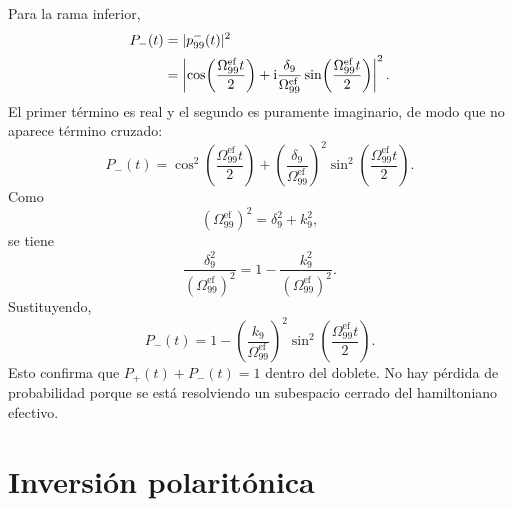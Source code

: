 \documentclass[11pt]{article}
\newcommand{\ii}{\mathrm{i}}
\begin{document}
Para la rama inferior,
\begin{align}
  P_-(t)
  &=
  |p_{99}^{-}(t)|^2
  \notag\\
  &=
  \left|
  \cos\!\left(\frac{\Omega_{99}^{\mathrm{ef}}t}{2}\right)
  +
  \ii
  \frac{\delta_9}{\Omega_{99}^{\mathrm{ef}}}
  \sin\!\left(\frac{\Omega_{99}^{\mathrm{ef}}t}{2}\right)
  \right|^2.
\end{align}
El primer t\'ermino es real y el segundo es puramente imaginario, de modo que
no aparece t\'ermino cruzado:
\begin{equation}
  P_-(t)
  =
  \cos^2\!\left(\frac{\Omega_{99}^{\mathrm{ef}}t}{2}\right)
  +
  \left(
  \frac{\delta_9}{\Omega_{99}^{\mathrm{ef}}}
  \right)^2
  \sin^2\!\left(\frac{\Omega_{99}^{\mathrm{ef}}t}{2}\right).
\end{equation}
Como
\begin{equation}
  (\Omega_{99}^{\mathrm{ef}})^2=\delta_9^2+k_9^2,
\end{equation}
se tiene
\begin{equation}
  \frac{\delta_9^2}{(\Omega_{99}^{\mathrm{ef}})^2}
  =
  1-
  \frac{k_9^2}{(\Omega_{99}^{\mathrm{ef}})^2}.
\end{equation}
Sustituyendo,
\begin{equation}
  \boxed{
  P_-(t)
  =
  1-
  \left(
  \frac{k_9}{\Omega_{99}^{\mathrm{ef}}}
  \right)^2
  \sin^2\!\left(
  \frac{\Omega_{99}^{\mathrm{ef}}t}{2}
  \right).
  }
\end{equation}
Esto confirma que $P_+(t)+P_-(t)=1$ dentro del doblete. No hay p\'erdida de
probabilidad porque se est\'a resolviendo un subespacio cerrado del
hamiltoniano efectivo.

\section{Inversi\'on polarit\'onica}
\end{document}
